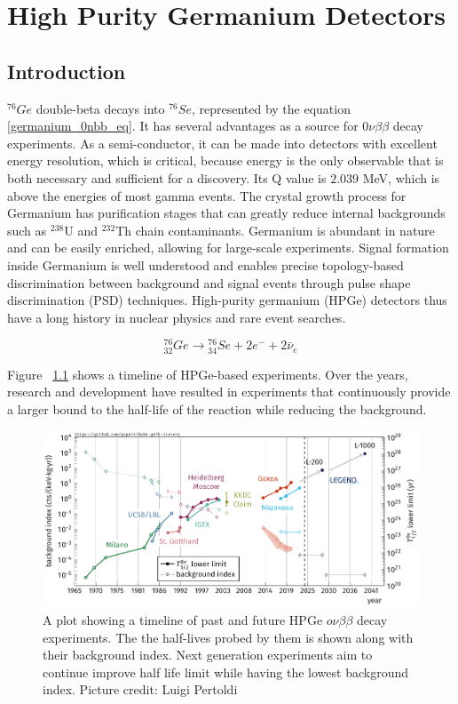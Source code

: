 \chapter{High Purity Germanium Detectors}
\label{chap:detectors}

\section{Introduction}
${}^{76}Ge$ double-beta decays into ${}^{76}Se$, represented by the equation \ref{germanium_0nbb_eq}. It has several advantages as a source for $0\nu\beta\beta$ decay experiments. As a semi-conductor, it can be made into detectors with excellent energy resolution, which is critical, because energy is the only observable that is both necessary and sufficient for a discovery. Its Q value is $2.039$ MeV, which is above the energies of most gamma events. The crystal growth process for Germanium has purification stages that can greatly reduce internal backgrounds such as $^{238}$U and $^{232}$Th chain contaminants. Germanium is abundant in nature and can be easily enriched, allowing for large-scale experiments. Signal formation inside Germanium is well understood and enables precise topology-based discrimination between background and signal events through pulse shape discrimination (PSD) techniques. High-purity germanium (HPGe) detectors thus have a long history in nuclear physics and rare event searches.


\begin{equation}\label{germanium_0nbb_eq}
{}_{32}^{76}Ge \rightarrow {}_{34}^{76}Se + 2e^- + 2\bar{\nu}_e
\end{equation}

Figure ~\ref{past_ge_exp} shows a timeline of HPGe-based experiments. Over the years, research and development have resulted in experiments that continuously provide a larger bound to the half-life of the reaction while reducing the background. 

\begin{figure}[!htb]
\centering
\includegraphics[trim=0.1cm 0 0.1cm 0,clip, width=0.99\linewidth]{ch2/figs/0nbb-ge76-history-future.pdf}
\caption{A plot showing a timeline of past and future HPGe $o\nu\beta\beta$ decay experiments. The the half-lives probed by them is shown along with their background index. Next generation experiments aim to continue improve half life limit while having the lowest background index. Picture credit: Luigi Pertoldi}
\label{past_ge_exp}
\end{figure}


